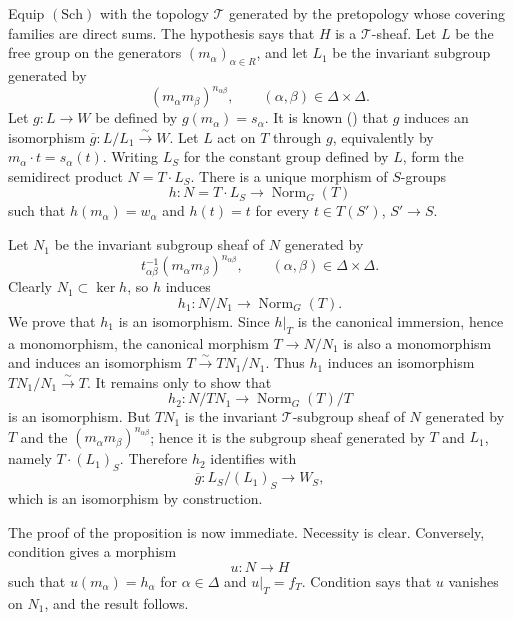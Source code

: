 \SGAProof
Equip \((\mathrm{Sch})\) with the topology \(\mathcal T\) generated
by the pretopology whose covering families are direct sums. The
hypothesis says that \(H\) is a \(\mathcal T\)-sheaf. Let \(L\) be
the free group on the generators \((m_\alpha)_{\alpha\in R}\), and
let \(L_1\) be the invariant subgroup generated by
\[
  (m_\alpha m_\beta)^{n_{\alpha\beta}},
  \qquad(\alpha,\beta)\in\Delta\times\Delta.
\]
Let \(g:L\to W\) be defined by \(g(m_\alpha)=s_\alpha\). It is known
() that \(g\) induces an isomorphism
\(\overline g:L/L_1\xrightarrow{\sim}W\). Let \(L\) act on \(T\)
through \(g\), equivalently by \(m_\alpha\cdot t=s_\alpha(t)\).
Writing \(L_S\) for the constant group defined by \(L\), form the
semidirect product \(N=T\cdot L_S\). There is a unique morphism of
\(S\)-groups
\[
  h:N=T\cdot L_S\longrightarrow\operatorname{Norm}_G(T)
\]
such that \(h(m_\alpha)=w_\alpha\) and \(h(t)=t\) for every
\(t\in T(S')\), \(S'\to S\).

Let \(N_1\) be the invariant subgroup sheaf of \(N\) generated by
\[
  t_{\alpha\beta}^{-1}(m_\alpha m_\beta)^{n_{\alpha\beta}},
  \qquad(\alpha,\beta)\in\Delta\times\Delta.
\]
Clearly \(N_1\subset\ker h\), so \(h\) induces
\[
  h_1:N/N_1\longrightarrow\operatorname{Norm}_G(T).
\]
We prove that \(h_1\) is an isomorphism. Since \(h|_T\) is the
canonical immersion, hence a monomorphism, the canonical morphism
\(T\to N/N_1\) is also a monomorphism and induces an isomorphism
\(T\xrightarrow{\sim}TN_1/N_1\). Thus \(h_1\) induces an
isomorphism \(TN_1/N_1\xrightarrow{\sim}T\). It remains only to show
that
\[
  h_2:N/TN_1\longrightarrow\operatorname{Norm}_G(T)/T
\]
is an isomorphism. But \(TN_1\) is the invariant
\(\mathcal T\)-subgroup sheaf of \(N\) generated by \(T\) and the
\((m_\alpha m_\beta)^{n_{\alpha\beta}}\); hence it is the subgroup
sheaf generated by \(T\) and \(L_1\), namely \(T\cdot(L_1)_S\).
Therefore \(h_2\) identifies with
\[
  \overline g:L_S/(L_1)_S\longrightarrow W_S,
\]
which is an isomorphism by construction.

The proof of the proposition is now immediate. Necessity is clear.
Conversely, condition  gives a morphism
\[
  u:N\longrightarrow H
\]
such that \(u(m_\alpha)=h_\alpha\) for \(\alpha\in\Delta\) and
\(u|_T=f_T\). Condition  says that \(u\) vanishes on \(N_1\),
and the result follows.


